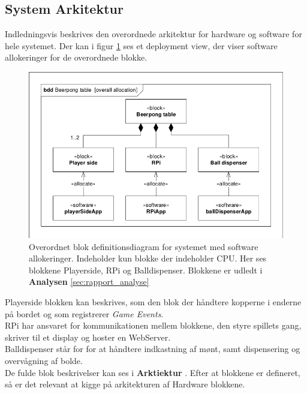 \documentclass[Rapport/Rapport_main.tex]{subfiles}
\begin{document}
\subsection{System Arkitektur}
Indledningsvis beskrives den overordnede arkitektur for hardware og software for hele systemet. Der kan i figur \ref{fig:rap_systemarkitektur} ses et deployment view, der viser software allokeringer for de overordnede blokke.
\begin{figure}[H]
    \centering
    \includegraphics[width=1\textwidth,trim={0.24in 0.24in 0.24in 0.24in},clip, page=1]{Arkitektur/graphics/BDD_og_IBD.pdf}
    \caption{Overordnet blok definitionsdiagram for systemet med software allokeringer. Indeholder kun blokke der indeholder CPU. Her ses blokkene Playerside, RPi og Balldispenser. Blokkene er udledt i \textbf{Analysen} \ref{sec:rapport_analyse}}
    \label{fig:rap_systemarkitektur}
\end{figure}
Playerside blokken kan beskrives, som den blok der håndtere kopperne i enderne på bordet og som registrerer \textit{Game Events}.\\
RPi har ansvaret for kommunikationen mellem blokkene, den styre spillets gang, skriver til et display og hoster en WebServer. \\
Balldispenser står for for at håndtere indkastning af mønt, samt dispensering og overvågning af bolde.\\
De fulde blok beskrivelser kan ses i \textbf{Arktiektur} . Efter at blokkene er defineret, så er det relevant at kigge på arkitekturen af Hardware blokkene.
\end{document}
